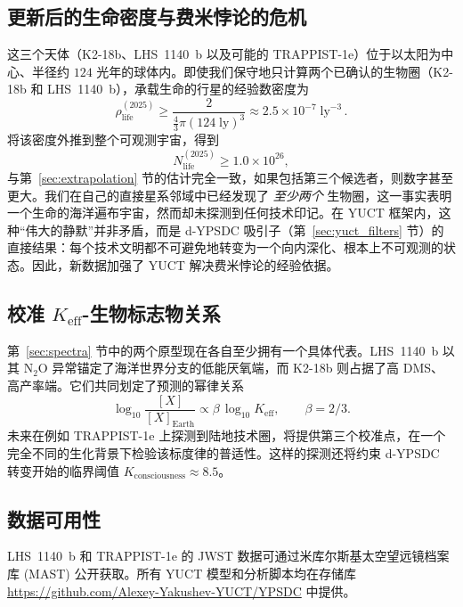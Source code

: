 \documentclass[11pt,a4paper]{article}
\begin{document}
	\subsection{更新后的生命密度与费米悖论的危机}
	这三个天体（K2-18b、LHS~1140~b 以及可能的 TRAPPIST-1e）位于以太阳为中心、半径约 \(124\) 光年的球体内。即使我们保守地只计算两个已确认的生物圈（K2-18b 和 LHS~1140~b），承载生命的行星的经验数密度为
	\begin{equation}
		\rho_{\mathrm{life}}^{(2025)} \ge \frac{2}{\frac{4}{3}\pi (124\;\mathrm{ly})^{3}} \approx 2.5\times10^{-7}\;\mathrm{ly}^{-3}\, .
	\end{equation}
	将该密度外推到整个可观测宇宙，得到
	\begin{equation}
		N_{\mathrm{life}}^{(2025)} \ge 1.0\times10^{26} ,
	\end{equation}
	与第~\ref{sec:extrapolation} 节的估计完全一致，如果包括第三个候选者，则数字甚至更大。我们在自己的直接星系邻域中已经发现了 \emph{至少两个} 生物圈，这一事实表明一个生命的海洋遍布宇宙，然而却未探测到任何技术印记。在 YUCT 框架内，这种“伟大的静默”并非矛盾，而是 d-YPSDC 吸引子（第~\ref{sec:yuct_filters} 节）的直接结果：每个技术文明都不可避免地转变为一个向内深化、根本上不可观测的状态。因此，新数据加强了 YUCT 解决费米悖论的经验依据。
	
	\subsection{校准 \(K_{\mathrm{eff}}\)-生物标志物关系}
	第~\ref{sec:spectra} 节中的两个原型现在各自至少拥有一个具体代表。LHS~1140~b 以其 N$_2$O 异常锚定了海洋世界分支的低能厌氧端，而 K2-18b 则占据了高 DMS、高产率端。它们共同划定了预测的幂律关系
	\begin{equation}
		\log_{10} \frac{[X]}{[X]_{\mathrm{Earth}}} \propto \beta\,\log_{10} K_{\mathrm{eff}} ,\qquad \beta=2/3 .
	\end{equation}
	未来在例如 TRAPPIST-1e 上探测到陆地技术圈，将提供第三个校准点，在一个完全不同的生化背景下检验该标度律的普适性。这样的探测还将约束 d-YPSDC 转变开始的临界阈值 \(K_{\mathrm{consciousness}}\approx 8.5\)。
	
	\subsection*{数据可用性}
	LHS~1140~b 和 TRAPPIST-1e 的 JWST 数据可通过米库尔斯基太空望远镜档案库 (MAST) 公开获取。所有 YUCT 模型和分析脚本均在存储库 \url{https://github.com/Alexey-Yakushev-YUCT/YPSDC} 中提供。
	
\end{document}
